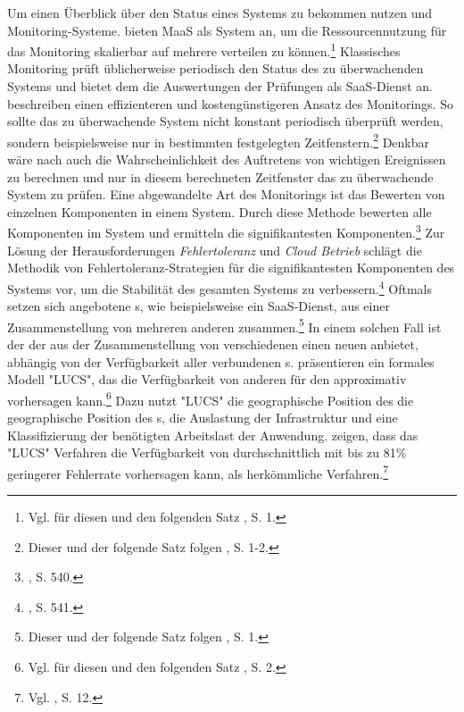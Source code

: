 \newline
\newline
Um einen Überblick über den Status eines \CC Systems zu bekommen nutzen \CSU und \CSP Monitoring-Systeme. \CSP bieten \acf{MaaS} als \CC System an, um die Ressourcennutzung für das Monitoring skalierbar auf mehrere \CSU verteilen zu können.\footnote{Vgl. für diesen und den folgenden Satz \cite{Meng.2012}, S. 1.}
Klassisches Monitoring prüft üblicherweise periodisch den Status des zu überwachenden Systems und bietet dem \CSU die Auswertungen der Prüfungen als \acs{SaaS}-Dienst an.
\cite{Meng.2012} beschreiben einen effizienteren und kostengünstigeren Ansatz des Monitorings. So sollte das zu überwachende System nicht konstant periodisch überprüft werden, sondern beispielsweise nur in bestimmten festgelegten Zeitfenstern.\footnote{Dieser und der folgende Satz folgen \cite{Meng.2012}, S. 1-2.}
Denkbar wäre nach \cite{Meng.2012} auch die Wahrscheinlichkeit des Auftretens von wichtigen Ereignissen zu berechnen und nur in diesem berechneten Zeitfenster das zu überwachende System zu prüfen. 
\newline
Eine abgewandelte Art des Monitorings ist das Bewerten von einzelnen Komponenten in einem \CC System. Durch diese Methode bewerten \cite{Zheng.2012} alle Komponenten im \CC System und ermitteln die signifikantesten Komponenten.\footnote{\cite{Zheng.2012}, S. 540.}
Zur Lösung der Herausforderungen \emph{Fehlertoleranz} und \emph{Cloud Betrieb} schlägt die Methodik von \cite{Zheng.2012} Fehlertoleranz-Strategien für die signifikantesten Komponenten des \CC Systems vor, um die Stabilität des gesamten Systems zu verbessern.\footnote{\cite{Zheng.2012}, S. 541.}
\newline
\newline
Oftmals setzen sich angebotene \Cs s, wie beispielsweise ein \acs{SaaS}-Dienst, aus einer Zusammenstellung von mehreren anderen \CSs zusammen.\footnote{Dieser und der folgende Satz folgen \cite{Silic.2013}, S. 1.}
In einem solchen Fall ist der \CSPComma der aus der Zusammenstellung von verschiedenen \CSs einen neuen \CS anbietet, abhängig von der Verfügbarkeit aller verbundenen \Cs s.
\cite{Silic.2013} präsentieren ein formales Modell "LUCS", das die Verfügbarkeit von anderen \CSs für den \CSP approximativ vorhersagen kann.\footnote{Vgl. für diesen und den folgenden Satz \cite{Silic.2013}, S. 2.}
Dazu nutzt "LUCS" die geographische Position des \CSUsComma die geographische Position des \Cs s, die Auslastung der \CS Infrastruktur und eine Klassifizierung der benötigten Arbeitslast der Anwendung. \cite{Silic.2013} zeigen, dass das "LUCS" Verfahren die Verfügbarkeit von \CSs durchschnittlich mit bis zu 81\% geringerer Fehlerrate vorhersagen kann, als herkömmliche Verfahren.\footnote{Vgl. \cite{Silic.2013}, S. 12.}
